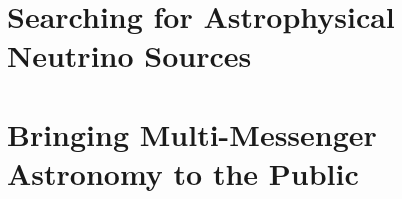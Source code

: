 \documentclass[%
	paper=A4,					
	twoside=true,				
	openright,					%
	parskip=full,				%
	chapterprefix=true,			%
	12pt,						%
	headings=normal,			%
	bibliography=totoc,			%
	listof=totoc,				%
	titlepage=on,				%
	captions=tableabove,		%
	draft=false,				%
]{scrreprt}%
\begin{document}
\newcommand\brabar{\scalebox{.3}{(}\raisebox{-1.7pt}{$-$}\scalebox{.3}{)}}


\pagestyle{empty}				%
\clearpage

\pagestyle{plain}				%
\clearpage
%
\clearpage
%
\setcounter{tocdepth}{2}		%
\tableofcontents				%
\clearpage

\setcounter{page}{1}			%
\pagestyle{maincontentstyle} 	%

\part{Searching for Astrophysical Neutrino Sources}
 
 





\part{Bringing Multi-Messenger Astronomy to the Public}




\appendix
 





\nocite{*}
\clearpage
\end{document}
